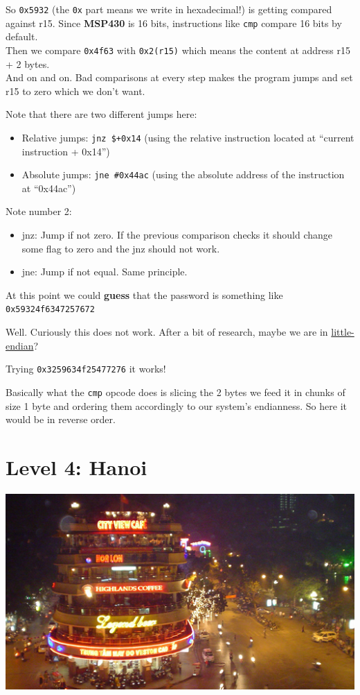 \documentclass[a4paper,11pt]{article}
\begin{document}
So \texttt{0x5932} (the \texttt{0x} part means we write in hexadecimal!)
is getting compared against r15. Since \textbf{MSP430} is 16 bits,
instructions like \texttt{cmp} compare 16 bits by default.\\Then we
compare \texttt{0x4f63} with \texttt{0x2(r15)} which means the content
at address r15 + 2 bytes.\\And on and on. Bad comparisons at every step
makes the program jumps and set r15 to zero which we don't want.

Note that there are two different jumps here:

\begin{itemize}
\itemsep1pt\parskip0pt
\item
  Relative jumps: \texttt{jnz \$+0x14} (using the relative instruction
  located at ``current instruction + 0x14'')
\item
  Absolute jumps: \texttt{jne \#0x44ac} (using the absolute address of
  the instruction at ``0x44ac'')
\end{itemize}

Note number 2:

\begin{itemize}
\itemsep1pt\parskip0pt
\item
  jnz: Jump if not zero. If the previous comparison checks it should
  change some flag to zero and the jnz should not work.
\item
  jne: Jump if not equal. Same principle.
\end{itemize}

At this point we could \textbf{guess} that the password is something
like \texttt{0x59324f6347257672}

Well. Curiously this does not work. After a bit of research, maybe we
are in \href{http://en.wikipedia.org/wiki/Endianness}{little-endian}?

Trying \texttt{0x3259634f25477276} it works!

Basically what the \texttt{cmp} opcode does is slicing the 2 bytes we
feed it in chunks of size 1 byte and ordering them accordingly to our
system's endianness. So here it would be in reverse order.

\section{Level 4: Hanoi}\label{level-4-hanoi}

\includegraphics{img/4_1.PNG}
\end{document}

